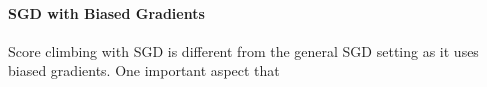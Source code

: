 


%
%
%

\paragraph{SGD with Biased Gradients}
Score climbing with SGD is different from the general SGD setting as it uses biased gradients.
One important aspect that 


%
%
%

%

